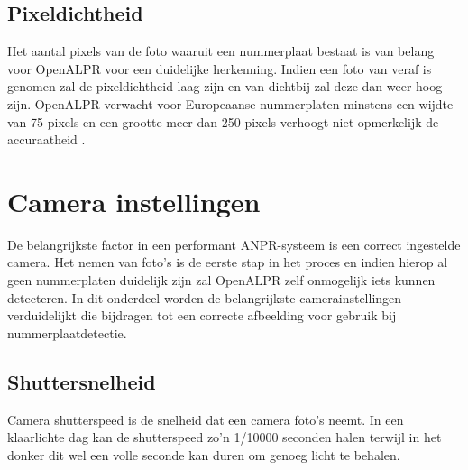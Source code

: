 \subsection{Pixeldichtheid}
Het aantal pixels van de foto waaruit een nummerplaat bestaat is van belang voor OpenALPR voor een duidelijke herkenning. Indien een foto van veraf is genomen zal de pixeldichtheid laag zijn en van dichtbij zal deze dan weer hoog zijn. OpenALPR verwacht voor Europeaanse nummerplaten minstens een wijdte van 75 pixels en een grootte meer dan 250 pixels verhoogt niet opmerkelijk de accuraatheid  \autocite{openalprcameraplacement}.

\section{Camera instellingen}
De belangrijkste factor in een performant ANPR-systeem is een correct ingestelde camera. Het nemen van foto's is de eerste stap in het proces en indien hierop al geen nummerplaten duidelijk zijn zal OpenALPR zelf onmogelijk iets kunnen detecteren. In dit onderdeel worden de belangrijkste camerainstellingen verduidelijkt die bijdragen tot een correcte afbeelding voor gebruik bij nummerplaatdetectie.

\subsection{Shuttersnelheid}

Camera shutterspeed is de snelheid dat een camera foto's neemt. In een klaarlichte dag kan de shutterspeed zo'n 1/10000 seconden halen terwijl in het donker dit wel een volle seconde kan duren om genoeg licht te behalen. \autocite{openalprcameraplacement}


